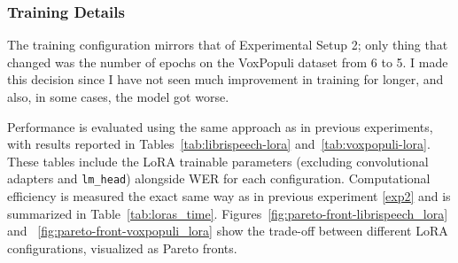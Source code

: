 \subsubsection{Training Details}

The training configuration mirrors that of Experimental Setup 2; only thing that changed was the number of epochs on the VoxPopuli \cite{wang2021voxpopulilargescalemultilingualspeech} dataset from 6 to 5. I made this decision since I have not seen much improvement in training for longer, and also, in some cases, the model got worse.

Performance is evaluated using the same approach as in previous experiments, with results reported in Tables~\ref{tab:librispeech-lora} and~\ref{tab:voxpopuli-lora}. These tables include the LoRA trainable parameters (excluding convolutional adapters and \texttt{lm\_head}) alongside WER for each configuration. Computational efficiency is measured the exact same way as in previous experiment \ref{exp2} and is summarized in Table~\ref{tab:loras_time}. Figures~\ref{fig:pareto-front-librispeech_lora} and ~\ref{fig:pareto-front-voxpopuli_lora} show the trade-off between different LoRA configurations, visualized as Pareto fronts.

